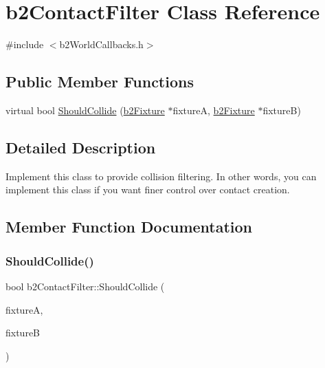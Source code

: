 \hypertarget{classb2ContactFilter}{}\section{b2\+Contact\+Filter Class Reference}
\label{classb2ContactFilter}


{\ttfamily \#include $<$b2\+World\+Callbacks.\+h$>$}

\subsection*{Public Member Functions}
\begin{DoxyCompactItemize}
\item 
virtual bool \mbox{\hyperlink{classb2ContactFilter_aac8f6155d1f577d125db587f5269289b}{Should\+Collide}} (\mbox{\hyperlink{classb2Fixture}{b2\+Fixture}} $\ast$fixtureA, \mbox{\hyperlink{classb2Fixture}{b2\+Fixture}} $\ast$fixtureB)
\end{DoxyCompactItemize}


\subsection{Detailed Description}
Implement this class to provide collision filtering. In other words, you can implement this class if you want finer control over contact creation. 

\subsection{Member Function Documentation}
\mbox{\label{classb2ContactFilter_aac8f6155d1f577d125db587f5269289b}} 
\subsubsection{\texorpdfstring{Should\+Collide()}{ShouldCollide()}}
{\footnotesize\ttfamily bool b2\+Contact\+Filter\+::\+Should\+Collide (\begin{DoxyParamCaption}\item[{\mbox{\hyperlink{classb2Fixture}{b2\+Fixture}} $\ast$}]{fixtureA,  }\item[{\mbox{\hyperlink{classb2Fixture}{b2\+Fixture}} $\ast$}]{fixtureB }\end{DoxyParamCaption})\hspace{0.3cm}{\ttfamily [virtual]}}

